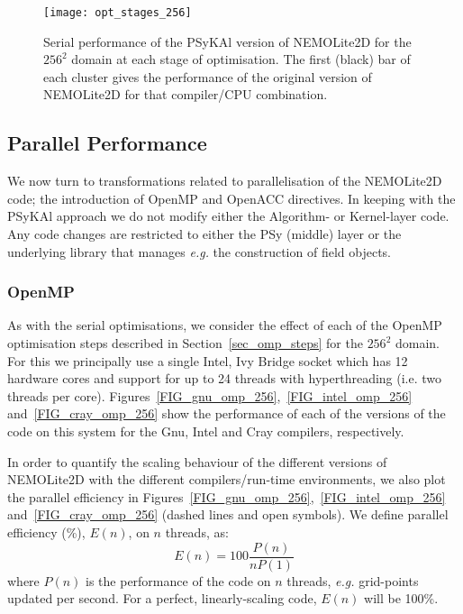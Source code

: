 \documentclass[gmdd, manuscript]{copernicus}
\begin{document}
\begin{figure}[!t]
\centering
\texttt{[image: opt\_stages\_256]}
\caption{Serial performance of the {PS}y{KA}l version of NEMOLite2D for the
  $256^{2}$ domain at each stage of optimisation. The first (black)
  bar of each cluster gives the performance of the original version of
  NEMOLite2D for that compiler/CPU combination.}
\label{FIG_opt_stages_256}
\end{figure}

\subsection{Parallel Performance}

We now turn to transformations related to parallelisation of the
NEMOLite2D code; the introduction of OpenMP and OpenACC directives. In
keeping with the {PS}y{KA}l approach we do not modify either the
Algorithm- or Kernel-layer code.  Any code changes are restricted to
either the PSy (middle) layer or the underlying library that manages
\textit{e.g.} the construction of field objects.

\subsubsection{OpenMP}

As with the serial optimisations, we consider the effect of each of
the OpenMP optimisation steps described in Section~\ref{sec_omp_steps}
for the $256^2$ domain. For this we principally use a single Intel,
Ivy Bridge socket which has 12 hardware cores and support for up to 24
threads with hyperthreading (i.e. two threads per core).
Figures~\ref{FIG_gnu_omp_256},~\ref{FIG_intel_omp_256}
and~\ref{FIG_cray_omp_256} show the performance of each of the
versions of the code on this system for the Gnu, Intel and Cray
compilers, respectively.

In order to quantify the scaling behaviour of the different versions
of NEMOLite2D with the different compilers/run-time environments, we
also plot the parallel efficiency in
Figures~\ref{FIG_gnu_omp_256},~\ref{FIG_intel_omp_256}
and~\ref{FIG_cray_omp_256} (dashed lines and open symbols). We define
parallel efficiency (\%), $E(n)$, on $n$ threads, as:
\[
E(n) = 100  \frac{P(n)}{ n P(1)}
\]
where $P(n)$ is the performance of the code on $n$ threads,
\textit{e.g.} grid-points updated per second. For a
perfect, linearly-scaling code, $E(n)$ will be 100\%.
\end{document}
